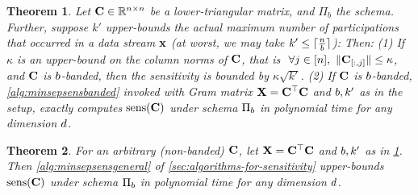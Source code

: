 \documentclass{article}
\newtheorem{theorem}{Theorem}
\begin{document}
%
\begin{theorem}\label{thm:minsepsens}
Let $\mathbf{C} \in \mathbb{R}^{n \times n}$ be a lower-triangular matrix, and $\Pi_b$ the \bparticipation schema.  Further, suppose $k'$ upper-bounds the actual maximum number of participations that occurred in a data stream $\mathbf{x}$ (at worst, we may take $k' \le \lceil\frac{n}{b}\rceil$):
Then:
(1) If $\kappa$ is an upper-bound on the column norms of $\mathbf{C}$, that is $\ \forall j \in [n], \ \norm{\bfC\idx{:}{j}} \le \kappa$,  and $\mathbf{C}$ is $b$-banded, then the sensitivity is bounded by $\kappa \sqrt{k'}$.
(2) If $\mathbf{C}$ is $b$-banded, \cref{alg:minsepsensbanded} invoked with Gram matrix $\mathbf{X} = \mathbf{C}^\top\mathbf{C}$ and $b, k'$ as in the setup, exactly computes $\operatorname{sens}(\mathbf{C})$ under schema $\Pi_{b}$ in polynomial time for any dimension $d$.
\end{theorem}
%
\begin{theorem}\label{thm:minsepsensgen}
For an arbitrary (non-banded) $\mathbf{C}$, let $\mathbf{X} = \mathbf{C}^\top\mathbf{C}$ and $b, k'$ as in \cref{thm:minsepsens}. Then \cref{alg:minsepsensgeneral} of \cref{sec:algorithms-for-sensitivity}  upper-bounds $\operatorname{sens}(\mathbf{C})$ under schema $\Pi_{b}$ in polynomial time for any dimension $d$.
\end{theorem}
%
%
%
\end{document}
